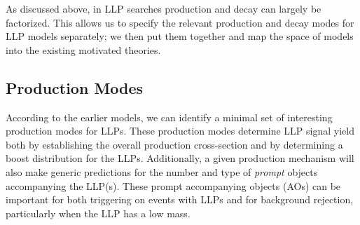 As discussed above, in LLP searches production and decay can largely be factorized. This allows us to specify the relevant production and decay modes for LLP models separately; we then put them together and map the space of models into the existing motivated theories.

\subsection{Production Modes}

According to the earlier models, we can identify a minimal set of interesting production modes for LLPs.
These production modes determine LLP signal yield both by establishing the overall production cross-section and by determining a boost distribution for the LLPs.   Additionally, a given production mechanism will also  make generic predictions for the number and type of {\em prompt} objects accompanying the LLP(s).  These prompt accompanying objects (AOs) can be important for both triggering on events with LLPs and for background rejection, particularly when the LLP has a low mass. 

